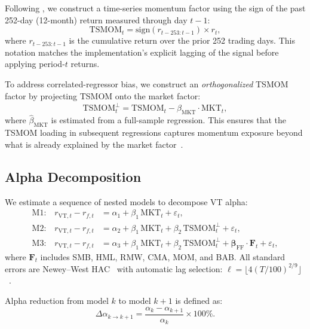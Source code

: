 Following \citet{moskowitz2012}, we construct a time-series momentum factor using the sign of the past 252-day (12-month) return measured through day $t-1$:
\begin{equation}
\text{TSMOM}_t = \text{sign}(r_{t-253:t-1}) \times r_t,
\label{eq:tsmom}
\end{equation}
where $r_{t-253:t-1}$ is the cumulative return over the prior 252 trading days. This notation matches the implementation's explicit lagging of the signal before applying period-$t$ returns.

To address correlated-regressor bias, we construct an \textit{orthogonalized} TSMOM factor by projecting TSMOM onto the market factor:
\begin{equation}
\text{TSMOM}_t^{\perp} = \text{TSMOM}_t - \hat{\beta}_{\text{MKT}} \cdot \text{MKT}_t,
\label{eq:tsmom_orth}
\end{equation}
where $\hat{\beta}_{\text{MKT}}$ is estimated from a full-sample regression. This ensures that the TSMOM loading in subsequent regressions captures momentum exposure beyond what is already explained by the market factor~\citep{hood2025}.

\subsection{Alpha Decomposition}

We estimate a sequence of nested models to decompose VT alpha:
\begin{align}
\text{M1:} \quad r_{\text{VT},t} - r_{f,t} &= \alpha_1 + \beta_1 \, \text{MKT}_t + \varepsilon_t, \label{eq:m1} \\
\text{M2:} \quad r_{\text{VT},t} - r_{f,t} &= \alpha_2 + \beta_1 \, \text{MKT}_t + \beta_2 \, \text{TSMOM}_t^{\perp} + \varepsilon_t, \label{eq:m2} \\
\text{M3:} \quad r_{\text{VT},t} - r_{f,t} &= \alpha_3 + \beta_1 \, \text{MKT}_t + \beta_2 \, \text{TSMOM}_t^{\perp} + \boldsymbol{\beta}_{\text{FF}} \cdot \mathbf{F}_t + \varepsilon_t, \label{eq:m3}
\end{align}
where $\mathbf{F}_t$ includes SMB, HML, RMW, CMA, MOM, and BAB. All standard errors are Newey--West HAC~\citep{newey1987} with automatic lag selection: $\ell = \lfloor 4(T/100)^{2/9} \rfloor$~\citep{newey1994}.

Alpha reduction from model $k$ to model $k+1$ is defined as:
\begin{equation}
\Delta\alpha_{k \to k+1} = \frac{\alpha_k - \alpha_{k+1}}{\alpha_k} \times 100\%.
\label{eq:alpha_reduction}
\end{equation}

